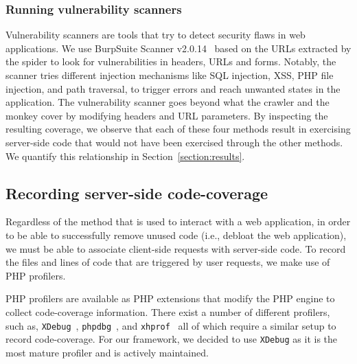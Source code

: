 
\subsubsection{Running vulnerability scanners}
Vulnerability scanners are tools that try to detect security flaws in web applications.
We use BurpSuite Scanner v2.0.14~\cite{burpsuite} based on the URLs extracted by the spider to look for vulnerabilities in headers, URLs and forms.
Notably, the scanner tries different injection mechanisms like SQL injection, XSS, PHP file injection, and path traversal, to trigger errors and reach unwanted states in the application.
The vulnerability scanner goes beyond what the crawler and the monkey cover by modifying headers and URL parameters.
By inspecting the resulting coverage, we observe that each of these four methods result in exercising server-side code that would not have been exercised through the other methods. We quantify this relationship in Section~\ref{section:results}.


\subsection{Recording server-side code-coverage}
\label{subsec:coverage}

Regardless of the method that is used to interact with a web application,
in order to be able to successfully remove unused code (i.e., debloat the web
application), we must be able to
associate client-side requests with server-side code. To record the files
and lines of code that are triggered by user requests, we make use of PHP
profilers.

PHP profilers are available as PHP extensions that modify the PHP engine to
collect code-coverage information. There exist a number of different profilers,
such as, \texttt{XDebug}~\cite{XDebug}, \texttt{phpdbg}~\cite{phpdbg}, and
\texttt{xhprof}~\cite{xhprof} all of which require a similar setup to record
code-coverage. For our framework, we decided to use \texttt{XDebug} as it
is the most mature profiler and is actively maintained.

